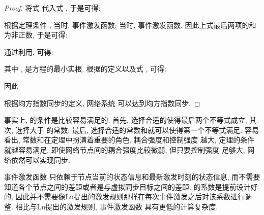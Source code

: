 \begin{proof}
        将式  代入式 , 于是可得:
        \begin{comment}
        \mathrm{E}\mathcal{L}V(t)&\leq-2a\mathrm{E}V(t)+b\mathrm{E}V(t-\tau)+[\pi+a+\pi_u-c\gamma(\lambda_2+\rho\beta)]\mathrm{E}\Big\{\hat{x}^\top(t)\hat{x}(t)\Big\}\\
        &\quad+c\bar{\gamma}(\bar{\lambda}+\rho\beta)\mathrm{E}\Big\{\|\hat{x}^{\top}(t)\|\|\hat{{\delta}}(t)\|\Big\}.
        \end{comment}
        根据定理条件 , 当时, 事件激发函数; 当时, 事件激发函数. 因此上式最后两项的和为非正数, 于是可得:
        \begin{comment}\label{dEVt}
        \mathrm{E}\mathcal{L}V(t)\leq-2a\mathrm{E}V(t)+b\mathrm{E}V(t-\tau).
        \end{comment}
        通过利用, 可得:
        \begin{comment}\label{v0}
        \mathrm{E}V(t)\leq V_0e^{-\epsilon t},
        \end{comment}
        其中 ,  是方程的最小实根. 根据的定义以及式 , 可得:
        \begin{comment}
        \mathrm{E}\|x_i(t)-{s}(t)\|^2\leq\frac{2}{\lambda^2_2}\mathrm{E}V(t)\leq\frac{2V_0}{\lambda_2^2}e^{-\epsilon t},\quad \forall i=1,\cdots,N.
        \end{comment}
        因此
        \begin{comment}
        \mathrm{E}\|x_i(t)-x_j(t)\|^2\leq\frac{8V_0}{\lambda_2^2}e^{-\epsilon t}, \quad\forall i,j=1,\cdots,N.
        \end{comment}
        根据均方指数同步的定义, 网络系统  可以达到均方指数同步.
        \end{proof}
        \begin{rem}
        事实上,  的条件是比较容易满足的. 首先, 选择合适的使得最后两个不等式成立; 其次, 选择大于 的常数; 最后, 选择合适的常数和就可以使得第一个不等式满足. 容易看出, 常数和在定理中扮演着重要的角色. 耦合强度和控制强度 越大, 定理的条件就越容易满足. 即使网络节点间的耦合强度比较微弱, 但只要控制强度 足够大, 网络依然可以实现同步.
        \end{rem}
        \begin{rem}
        事件激发函数  只依赖于节点当前的状态信息和最新激发时刻的状态信息, 而不需要知道各个节点之间的差距或者是与虚拟同步目标之间的差距. 的系数是提前设计好的, 因此并不需要像Lu提出的激发规则那样在每次事件激发之后对该系数进行调整. 相比与Lu提出的激发规则, 事件激发函数  具有更低的计算复杂度.
        \end{rem}

